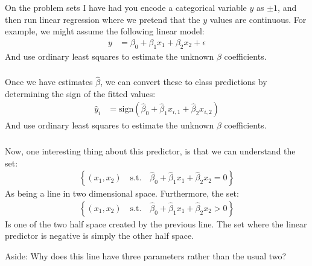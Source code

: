 \documentclass[xetex,mathserif,serif,aspectratio=169]{beamer}
\begin{document}
\begin{frame}[fragile] \frametitle{} \oldB \small

\textbf{}

On the problem sets I have had you encode a categorical variable $y$
as $\pm1$, and then run linear regression where we pretend that the
$y$ values are continuous. For example, we might assume the following
linear model:
\begin{align*}
y &= \beta_0 + \beta_1 x_1 + \beta_2 x_2 + \epsilon
\end{align*}
And use ordinary least squares to estimate the unknown $\beta$ coefficients.

\end{frame}


\begin{frame}[fragile] \frametitle{} \oldB \small

\textbf{}

Once we have estimates $\widehat{\beta}$, we can convert these to class
predictions by determining the sign of the fitted values:
\begin{align*}
\widehat{y}_i &= \text{sign} (\widehat{\beta}_0 + \widehat{\beta}_1 x_{i,1} + \widehat{\beta}_2 x_{i,2})
\end{align*}
And use ordinary least squares to estimate the unknown $\beta$ coefficients.

\end{frame}

\begin{frame}[fragile] \frametitle{} \oldB \small

\textbf{}

Now, one interesting thing about this predictor, is that we can understand
the set:
\begin{align*}
\left\{ (x_1, x_2)  \quad \text{s.t.} \quad \widehat{\beta}_0 + \widehat{\beta}_1 x_{1} + \widehat{\beta}_2 x_{2} = 0 \right\}
\end{align*}
As being a line in two dimensional space. Furthermore, the set:
\begin{align*}
\left\{ (x_1, x_2)  \quad \text{s.t.} \quad \widehat{\beta}_0 + \widehat{\beta}_1 x_{1} + \widehat{\beta}_2 x_{2} > 0 \right\}
\end{align*}
Is one of the two half space created by the previous line. The set where the linear predictor is
negative is simply the other half space.

Aside: Why does this line have three parameters rather than the usual two?

\end{frame}
\end{document}
